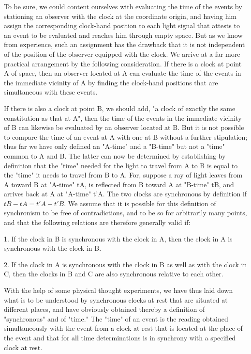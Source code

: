 ﻿\documentclass{article} %
\begin{document}
To be sure, we could content ourselves with evaluating the time of the events by stationing an observer with the clock at the coordinate origin, and having him assign the corresponding clock-hand position to each light signal that attests to an event to be evaluated and reaches him through empty space. 
But as we know from experience, such an assignment has the drawback that it is not independent of the position of the observer equipped with the clock. 
We arrive at a far more practical arrangement by the following consideration. 
If there is a clock at point A of space, then an observer located at A can evaluate the time of the events in the immediate vicinity of A by finding the clock-hand positions that are simultaneous with these events. 

If there is also a clock at point B, we should add, "a clock of exactly the same constitution as that at A", then the time of the events in the immediate vicinity of B can likewise be evaluated by an observer located at B. 
But it is not possible to compare the time of an event at A with one at B without a further stipulation; thus far we have only defined an "A-time" and a "B-time" but not a "time" common to A and B. 
The latter can now be determined by establishing by definition that the "time" needed for the light to travel from A to B is equal to the "time" it needs to travel from B to A. 
For, suppose a ray of light leaves from A toward B at "A-time" tA, is reflected from B toward A at "B-time" tB, and arrives back at A at "A-time" t'A. 
The two clocks are synchronous by definition if $tB-tA=t'A-t'B$. 
We assume that it is possible for this definition of synchronism to be free of contradictions, and to be so for arbitrarily many points, and that the following relations are therefore generally valid if:

1. 
If the clock in B is synchronous with the clock in A, then the clock in A is synchronous with the clock in B. 

2. 
If the clock in A is synchronous with the clock in B as well as with the clock in C, then the clocks in B and C are also synchronous relative to each other. 

With the help of some physical thought experiments, we have thus laid down what is to be understood by synchronous clocks at rest that are situated at different places, and have obviously obtained thereby a definition of "synchronous" and of "time." 
The "time" of an event is the reading obtained simultaneously with the event from a clock at rest that is located at the place of the event and that for all time determinations is in synchrony with a specified clock at rest. 
\end{document}
